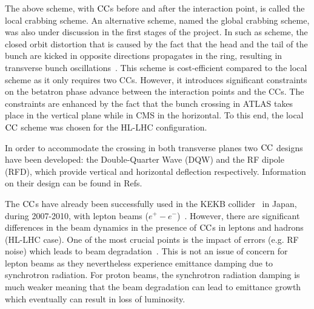 The above scheme, with ${\mathrm{CC}}$s before and after the interaction point, is called the local crabbing scheme. An alternative scheme, named the global crabbing scheme, was also under discussion in the first stages of the project. In such as scheme, the closed orbit distortion that is caused by the fact that the head and the tail of the bunch are kicked in opposite directions propagates in the ring, resulting in transverse bunch oscillations~\cite{Brning2015}. This scheme is cost-efficient compared to the local scheme as it only requires two CCs. However, it introduces significant constraints on the betatron phase advance between the interaction points and the CCs. The constraints are enhanced by the fact that the bunch crossing in ATLAS takes place in the vertical plane while in CMS in the horizontal. To this end, the local ${\mathrm{CC}}$ scheme was chosen for the HL-LHC configuration. %

In order to accommodate the crossing in both transverse planes two ${\mathrm{CC}}$ designs have been developed: the Double-Quarter Wave (DQW) and the RF dipole (RFD), which provide vertical and horizontal deflection respectively. Information on their design can be found in Refs.~\cite{Zanoni:2288282, DeSilva:2288607, Xiao:1992565, Verdú-Andrés:2113440}

The ${\mathrm{CC}}$s have already been successfully used in the KEKB collider~\cite{Toge:475260} in Japan, during 2007-2010, with lepton beams ($e^{+} - e^{-}$)~\cite{CC_KEKB_4440798, Funakoshi:1955812, oide:pac07-mozaki01}. However, there are significant differences in the beam dynamics in the presence of ${\mathrm{CC}}$s in leptons and hadrons (HL-LHC case). One of the most crucial points is the impact of errors (e.g. RF noise) which leads to beam degradation~\cite{Calaga:2773279, Alekou:2696109}. This is not an issue of concern for lepton beams as they nevertheless experience emittance damping due to synchrotron radiation. For proton beams, the synchrotron radiation damping is much weaker meaning that the beam degradation can lead to emittance growth which eventually can result in loss of luminosity. %


